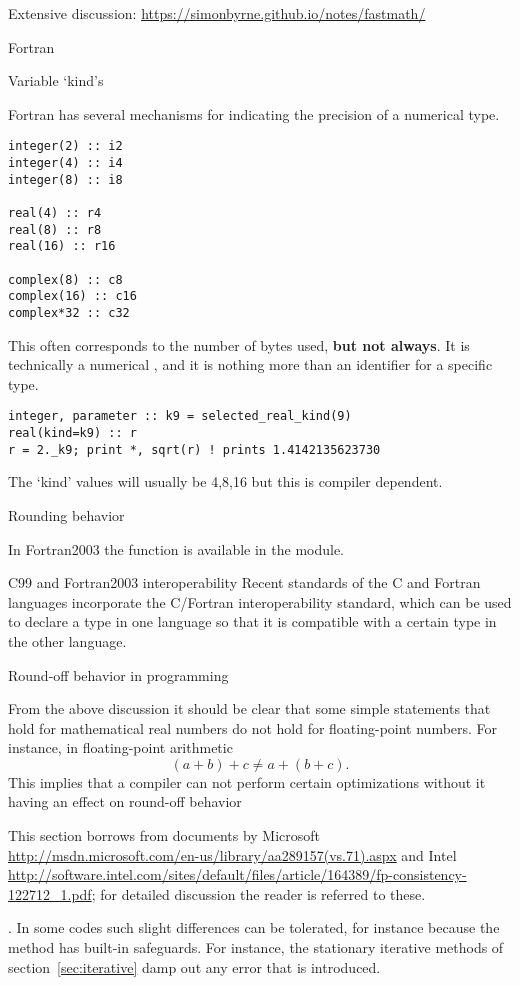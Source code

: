 Extensive discussion: \url{https://simonbyrne.github.io/notes/fastmath/}

 {Fortran}

 {Variable `kind's}
\label{sec:fprecision}

Fortran has several mechanisms for indicating the precision of a numerical type.
%
\begin{lstlisting}
integer(2) :: i2
integer(4) :: i4
integer(8) :: i8

real(4) :: r4
real(8) :: r8
real(16) :: r16

complex(8) :: c8
complex(16) :: c16
complex*32 :: c32
\end{lstlisting}

This often corresponds to the number of bytes used, \textbf{but not always}.
It is technically a numerical ,
and it is nothing more than an identifier for a specific type.

\begin{verbatim}
integer, parameter :: k9 = selected_real_kind(9)
real(kind=k9) :: r
r = 2._k9; print *, sqrt(r) ! prints 1.4142135623730
\end{verbatim}
The `kind' values will usually be 4,8,16 but this is compiler
dependent.

 {Rounding behavior}

In Fortran2003 the function 
is available in the  module.

 {C99 and Fortran2003 interoperability}
%
Recent standards of the C and Fortran
languages incorporate the C/Fortran interoperability standard, which
can be used to declare a type in one language so that it is compatible
with a certain type in the other language.

 {Round-off behavior in programming}
\label{sec:round-compile}

From the above discussion it should be clear that some simple statements
that hold for mathematical real numbers do not hold for floating-point numbers.
For instance, in floating-point arithmetic 
\begin{equation}
  (a+b)+c\not=a+(b+c).
\end{equation}
This implies that a compiler can not perform certain optimizations
without it having an effect on round-off behavior
\begin{footnoteenv}
  {This
section borrows from documents by
Microsoft \url{http://msdn.microsoft.com/en-us/library/aa289157(vs.71).aspx}
and
Intel \url{http://software.intel.com/sites/default/files/article/164389/fp-consistency-122712_1.pdf};
for detailed discussion the reader is referred to these.}
\end{footnoteenv}
.  In some
codes such slight differences can be tolerated, for instance because
the method has built-in safeguards. For instance, the stationary
iterative methods of section~\ref{sec:iterative} damp out any error
that is introduced. 

